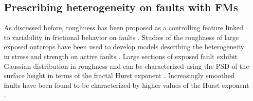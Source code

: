 \documentclass[preprint,1p, 10pt,authoryear]{elsarticle}
\begin{document}


\subsection{Prescribing heterogeneity on faults with FMs}
As discussed before, roughness has been proposed as a controlling feature linked to variability in frictional behavior on faults \citep{Scholz1986,Scholz2002}. Studies of the roughness of large exposed outcrops have been used to develop models describing the heterogeneity in stress and strength on active faults \citep[e.g.,][]{Schmittbuhl2006}. Large sections of exposed fault exhibit Gaussian distribution in roughness \citep[e.g.,][]{Renard2006} and can be characterized using the PSD of the surface height in terms of the fractal Hurst exponent \citep{Power1991, Schmittbuhl1995, Candela2009}. Increasingly smoothed faults have been found to be characterized by higher values of the Hurst exponent \citep{Brodsky2011, Siman-Tov2013, Kirkpatrick2014, Candela2016, Brodsky2016}. 
\end{document}
